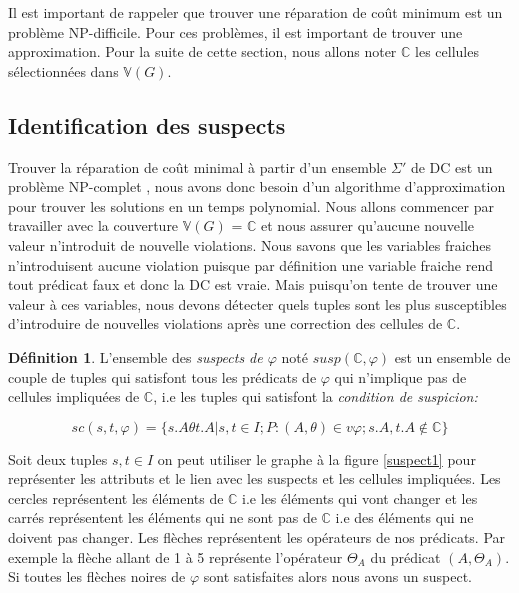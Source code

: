 \documentclass[letterpaper, 12pt]{report}
\theoremstyle{definition}
\newtheorem{mydef}{Définition}
\begin{document}
Il est important de rappeler que trouver une réparation de coût minimum est un problème NP-difficile. Pour ces problèmes, il est important de trouver une approximation. Pour la suite de cette section, nous allons noter $\mathbb{C}$ les cellules sélectionnées dans $\mathbb{V}(G)$.

\subsection{Identification des suspects}

Trouver la réparation de coût minimal à partir d'un ensemble $\Sigma'$ de DC est un problème NP-complet \cite{main}, nous avons donc besoin d'un algorithme d'approximation pour trouver les solutions en un temps polynomial. Nous allons commencer par travailler avec la couverture $\mathbb{V}(G)$ = $\mathbb{C}$ et nous assurer qu'aucune nouvelle valeur n'introduit de nouvelle violations. Nous savons que les variables fraiches n'introduisent aucune violation puisque par définition une variable fraiche rend tout prédicat faux et donc la DC est vraie. Mais puisqu'on tente de trouver une valeur à ces variables, nous devons détecter quels tuples sont les plus susceptibles d'introduire de nouvelles violations après une correction des cellules de $\mathbb{C}$.

\begin{mydef}
	L'ensemble des \emph{suspects de $\varphi$} noté $susp( \mathbb{C}, \varphi)$ est un ensemble de couple de tuples qui satisfont tous les prédicats de $\varphi$ qui n'implique pas de cellules impliquées de $\mathbb{C}$, i.e les tuples qui satisfont la \emph{condition de suspicion:}

	$$ sc(s,t,\varphi) = \{ s.A \theta t.A | s,t \in I ; P:(A,\theta) \in v\varphi ; s.A,t.A \not\in \mathbb{C} \}  $$
	 
\end{mydef}

Soit deux tuples $s,t \in I$ on peut utiliser le graphe à la figure \ref{suspect1} pour représenter les attributs et le lien avec les suspects et les cellules impliquées. Les cercles représentent les éléments de $\mathbb{C}$ i.e les éléments qui vont changer et les carrés représentent les éléments qui ne sont pas de $\mathbb{C}$ i.e des éléments qui ne doivent pas changer. Les flèches représentent les opérateurs de nos prédicats. Par exemple la flèche allant de 1 à 5 représente l'opérateur $\Theta_A$ du prédicat $(A,\Theta_A)$. Si toutes les flèches noires de $\varphi$ sont satisfaites alors nous avons un suspect.
\end{document}
